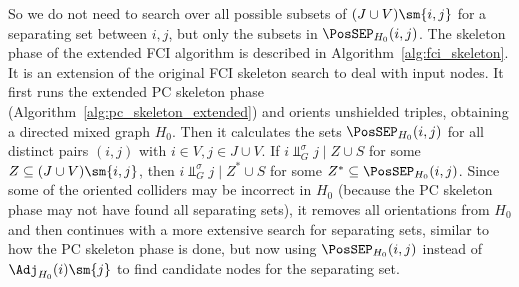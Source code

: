 So we do not need to search over all possible subsets of $(J \cup V) \sm \{i,j\}$ for a separating set between $i,j$, but only the subsets in $\PosSEP_{H_0}(i,j)$.
The skeleton phase of the extended FCI algorithm is described in Algorithm~\ref{alg:fci_skeleton}. 
It is an extension of the original FCI skeleton search \cite{SMR1995} to deal with input nodes. 
It first runs the extended PC skeleton phase (Algorithm~\ref{alg:pc_skeleton_extended}) and orients unshielded triples, obtaining a directed mixed graph $H_0$. 
Then it calculates the sets $\PosSEP_{H_0}(i,j)$ for all distinct pairs $(i,j)$ with $i \in V, j \in J \cup V$.
If $i \Perp^\sigma_G j \mid Z \cup S$ for some $Z \subseteq (J \cup V) \sm \{i,j\}$, then
$i \Perp^\sigma_G j \mid Z^* \cup S$ for some $Z^* \subseteq \PosSEP_{H_0}(i,j)$.
Since some of the oriented colliders may be incorrect in $H_0$ (because the PC skeleton phase may not have found all separating sets), it removes all orientations from $H_0$ and then continues with a more extensive search for separating sets, similar
to how the PC skeleton phase is done, but now using $\PosSEP_{H_0}(i,j)$ instead of $\Adj_{H_0}(i)\sm\{j\}$ to find candidate nodes for the separating set.

